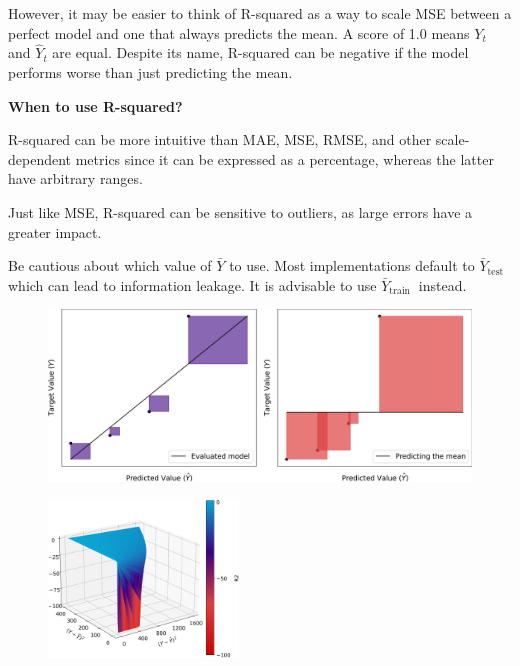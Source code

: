 However, it may be easier to think of R-squared as a way to scale MSE between a perfect model and one that always predicts the mean. A score of 1.0 means $Y_t$ and $\hat{Y}_t$ are equal. Despite its name, R-squared can be negative if the model performs worse than just predicting the mean.

\textbf{When to use R-squared?}

R-squared can be more intuitive than MAE, MSE, RMSE, and other scale-dependent metrics since it can be expressed as a percentage, whereas the latter have arbitrary ranges.

{
\item Just like MSE, R-squared can be sensitive to outliers, as large errors have a greater impact.
\item Be cautious about which value of $\bar{Y}$ to use. Most implementations default to $\bar{Y}_{\text {test }}$ which can lead to information leakage. It is advisable to use $\bar{Y}_{\text {train }}$ instead.
}


\clearpage
\thispagestyle{customstyle2}


\begin{figure}[ht!]
    \centering
    \includegraphics[width=\textwidth]{figures/R2_explained.png}
    \label{fig1}
\end{figure}

\begin{figure}
    \centering
    \vspace{-10pt} %
    \includegraphics[width=0.45\textwidth]{figures/R2_3d_surface.png} %
    \vspace{-10pt} %
\end{figure}

